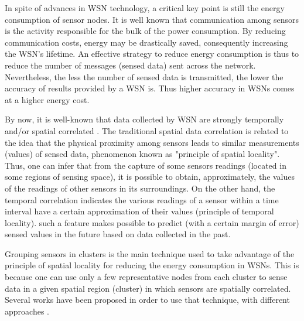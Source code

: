 \documentclass[conference]{IEEEtran}
\begin{document}
In spite of advances in WSN technology, a critical key point is still the
energy consumption of sensor nodes. It is well known that communication among
sensors is the activity responsible for the bulk of the power consumption. By
reducing communication costs, energy may be drastically saved, consequently
increasing the WSN's lifetime. An effective strategy to reduce energy
consumption is thus to reduce the number of messages (sensed data) sent across
the network. Nevertheless, the less the number of sensed data is transmitted,
the lower the accuracy of results provided by a WSN is. Thus higher accuracy in
WSNs comes at a higher energy cost.

By now, it is well-known that data collected by WSN are strongly temporally
and/or spatial correlated \cite{Yoon2005, Chu2006}. The traditional spatial data
correlation is related to the idea that the physical proximity among sensors
leads to similar measurements (values) of sensed data, phenomenon known as
"principle of spatial locality". Thus, one can infer that from the capture of
some sensors readings (located in some regions of sensing space), it is possible
to obtain, approximately, the values of the readings of other sensors in its
surroundings. On the other hand, the temporal correlation indicates the various
readings of a sensor within a time interval have a certain approximation of
their values (principle of temporal locality). such a feature makes possible to
predict (with a certain margin of error) sensed values in the future based on
data collected in the past.


Grouping sensors in clusters is the main technique used to take advantage of the
principle of spatial locality for reducing the energy consumption in WSNs. This
is because one can use only a few representative nodes from each cluster to
sense data in a given spatial region (cluster) in which sensors are spatially
correlated.
Several works have been proposed in order to use that technique, with different
approaches \cite{Chu2006, Villas2012, Singh2010, Liu2007, Shah2007}.

\end{document}
